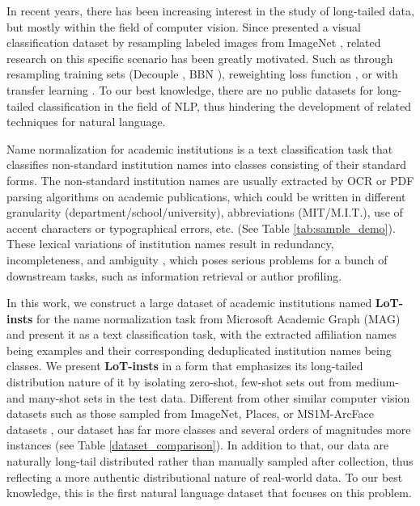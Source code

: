 \documentclass{article}
\begin{document}
In recent years, there has been increasing interest in the study of long-tailed data, but mostly within the field of computer vision. Since \cite{liu2019large} presented a visual classification dataset by resampling labeled images from ImageNet \cite{deng2009imagenet}, related research on this specific scenario has been greatly motivated. Such as 
through resampling training sets (Decouple \cite{kang2019decoupling}, BBN \cite{zhou2020bbn}), reweighting loss function \cite{cui2019class, cao2019learning, jamal2020rethinking}, or with transfer learning \cite{liu2020deep, xiang2020learning}. To our best knowledge, there are no public datasets for long-tailed classification in the field of NLP, thus hindering the development of related techniques for natural language. 

Name normalization for academic institutions is a text classification task that classifies non-standard institution names into classes consisting of their standard forms. The non-standard institution names are usually extracted by OCR or PDF parsing algorithms on academic publications, which could be written in different granularity (department/school/university), abbreviations (MIT/M.I.T.), use of accent characters or typographical errors, etc. (See Table \ref{tab:sample_demo}). These lexical variations of institution names result in redundancy, incompleteness, and ambiguity \cite{fatma2020canonicalizing}, which poses serious problems for a bunch of downstream tasks, such as information retrieval or author profiling. 


In this work, we construct a large dataset of academic institutions named \textbf{LoT-insts} for the name normalization task from Microsoft Academic Graph (MAG) \cite{sinha2015overview} and present it as a text classification task, with the extracted affiliation names being examples and their corresponding deduplicated institution names being classes.
We present \textbf{LoT-insts} in a form that emphasizes its long-tailed distribution nature of it by isolating zero-shot, few-shot sets out from medium- and many-shot sets in the test data. Different from other similar computer vision datasets such as those sampled from ImageNet, Places, or MS1M-ArcFace datasets \cite{liu2019large}, our dataset has far more classes and several orders of magnitudes more instances (see Table \ref{dataset_comparison}). In addition to that, our data are naturally long-tail distributed rather than manually sampled after collection, thus reflecting a more authentic distributional nature of real-world data. To our best knowledge, this is the first natural language dataset that focuses on this problem. 
\end{document}
